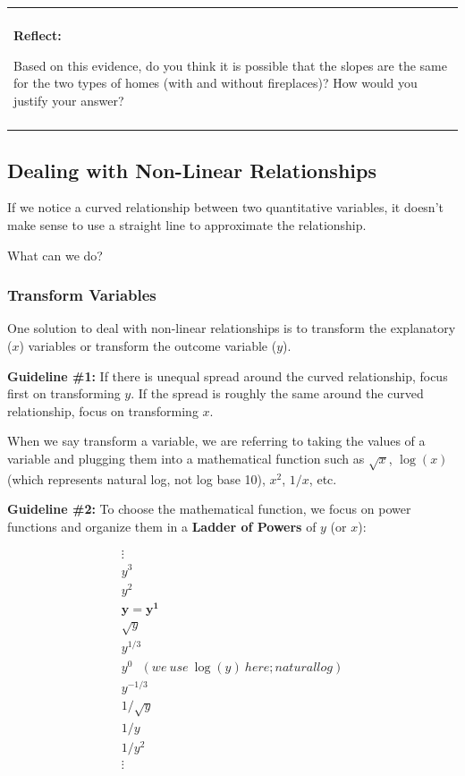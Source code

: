 \documentclass[]{book}
\newenvironment{reflect}
{
    \begin{center}
    
    \begin{tabular}{|p{0.8\textwidth}|}
    \rowcolor{LightBlue}
    \hline\\
    \rowcolor{LightBlue}
    \textbf{Reflect:}
}
{
    \\\rowcolor{LightBlue}
    \\\hline
    \end{tabular} 
    \end{center}
}
\begin{document}
\begin{reflect}
Based on this evidence, do you think it is possible that the slopes are
the same for the two types of homes (with and without fireplaces)? How
would you justify your answer?
\end{reflect}

\hypertarget{dealing-with-non-linear-relationships}{%
\subsection{Dealing with Non-Linear Relationships}\label{dealing-with-non-linear-relationships}}

If we notice a curved relationship between two quantitative variables, it doesn't make sense to use a straight line to approximate the relationship.

What can we do?

\hypertarget{transform-variables}{%
\subsubsection{Transform Variables}\label{transform-variables}}

One solution to deal with non-linear relationships is to transform the explanatory (\(x\)) variables or transform the outcome variable (\(y\)).

\textbf{Guideline \#1:} If there is unequal spread around the curved relationship, focus first on transforming \(y\). If the spread is roughly the same around the curved relationship, focus on transforming \(x\).

When we say transform a variable, we are referring to taking the values of a variable and plugging them into a mathematical function such as \(\sqrt{x}\), \(\log(x)\) (which represents natural log, not log base 10), \(x^2\), \(1/x\), etc.

\textbf{Guideline \#2:} To choose the mathematical function, we focus on power functions and organize them in a \textbf{Ladder of Powers} of \(y\) (or \(x\)):

\begin{align}
\vdots\\
y^3\\
y^2\\
\mathbf{y = y^1}\\
\sqrt{y}\\
y^{1/3}\\
y^{0} ~~~  (we~use~\log(y)~here; natural log)\\
y^{-1/3}\\
1/\sqrt{y}\\
1/y\\
1/y^2\\
\vdots
\end{align}
\end{document}

